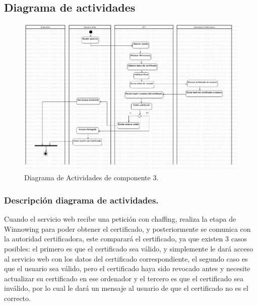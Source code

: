 \documentclass[12pt, a4paper, titlepage]{report}
\begin{document}
            \subsection{Diagrama de actividades}
            
                \begin{figure}[H]
                	\begin{center}	\includegraphics[width=13cm]{./imagenes/Disenio/Componente_3/CIII_DA.png}
                	\caption{Diagrama de Actividades de componente 3.}
                	\end{center}
        		\end{figure}   
        
                \subsubsection{Descripción diagrama de actividades.}
                Cuando el servicio web recibe una petición con chaffing, realiza la etapa de Winnowing para poder obtener el certificado, y posteriormente se comunica con la autoridad certificadora, este comparará el certificado, ya que existen 3 casos posibles: el primero es que el certificado sea válido, y simplemente le dará acceso al servicio web con los datos del certificado correspondiente, el segundo caso es que el usuario sea válido, pero el certificado haya sido revocado antes y necesite actualizar su certificado en ese ordenador y el tercero es que el certificado sea inválido, por lo cual le dará un mensaje al usuario de que el certificado no es el correcto.
            
\end{document}
